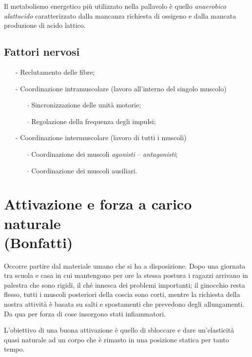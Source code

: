 \begin{ross_es}
Il metabolismo energetico più utilizzato nella pallavolo è quello
\emph{anaerobico alattacido} caratterizzato dalla mancanza richiesta di ossigeno
e dalla mancata produzione di acido lattico.
\end{ross_es}

\subsection{Fattori nervosi}
\begin{itemize}
\item[-] Reclutamento delle fibre;
\item[-] Coordinazione intramuscolare (lavoro all'interno del singolo muscolo)
  \begin{itemize}
  \item[$\cdot$]Sincronizzazione delle unità motorie;
  \item[$\cdot$]Regolazione della frequenza degli impulsi;
  \end{itemize}
\item[-] Coordinazione intermuscolare (lavoro di tutti i muscoli)
  \begin{itemize}
  \item[$\cdot$]Coordinazione dei muscoli \emph{agonisti} -- \emph{antagonisti};
  \item[$\cdot$]Coordinazione dei muscoli ausiliari.
  \end{itemize}
\end{itemize}

\section{Attivazione e forza a carico naturale \\(Bonfatti)}

Occorre partire dal materiale umano che si ha a disposizione.
Dopo una giornata tra scuola e casa in
cui mantengono per ore la stessa postura i ragazzi arrivano in palestra che sono rigidi, il ché innesca
dei problemi importanti; il ginocchio resta flesso, tutti i muscoli posteriori della coscia sono corti,
mentre la richiesta della nostra attività è basata su salti e spostamenti che prevedono degli
allungamenti. Da qua per forza di cose insorgono stati infiammatori.

L'obiettivo di una buona
attivazione è quello di sbloccare e dare un'elasticità quasi naturale ad un corpo che è rimasto in una posizione statica per tanto tempo.

